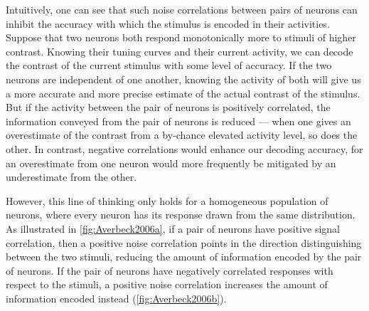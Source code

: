 Intuitively, one can see that such noise correlations between pairs of neurons can inhibit the accuracy with which the stimulus is encoded in their activities.
Suppose that two neurons both respond monotonically more to stimuli of higher contrast.
Knowing their tuning curves and their current activity, we can decode the contrast of the current stimulus with some level of accuracy.
If the two neurons are independent of one another, knowing the activity of both will give us a more accurate and more precise estimate of the actual contrast of the stimulus.
But if the activity between the pair of neurons is positively correlated, the information conveyed from the pair of neurons is reduced --- when one gives an overestimate of the contrast from a by-chance elevated activity level, so does the other.
In contrast, negative correlations would enhance our decoding accuracy, for an overestimate from one neuron would more frequently be mitigated by an underestimate from the other.

However, this line of thinking only holds for a homogeneous population of neurons, where every neuron has its response drawn from the same distribution.
As illustrated in \autoref{fig:Averbeck2006a}, if a pair of neurons have positive signal correlation, then a positive noise correlation points in the direction distinguishing between the two stimuli, reducing the amount of information encoded by the pair of neurons.
If the pair of neurons have negatively correlated responses with respect to the stimuli, a positive noise correlation increases the amount of information encoded instead (\autoref{fig:Averbeck2006b}).

